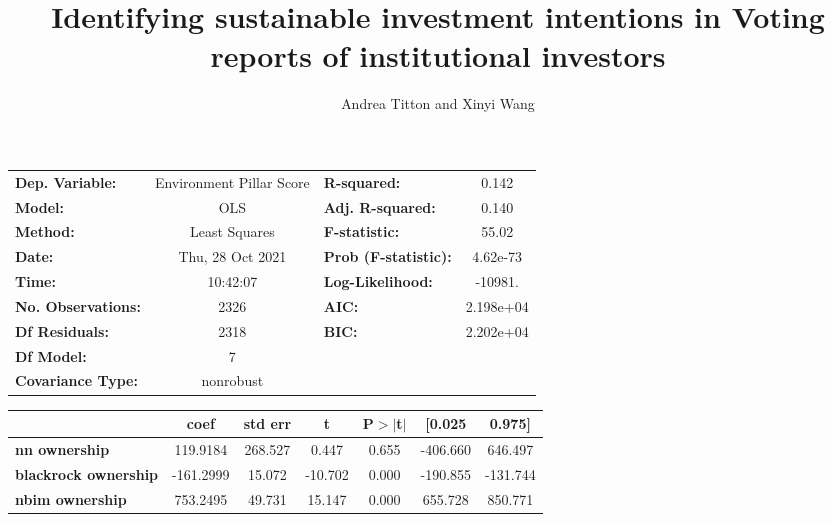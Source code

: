 \documentclass[a4paper]{article}
\title{Identifying sustainable investment intentions in Voting reports of institutional investors}
\author{Andrea Titton and Xinyi Wang}
\begin{document}
\maketitle
\begin{center}
  \begin{tabular}{lclc}
  \toprule
  \textbf{Dep. Variable:}                            & Environment Pillar Score & \textbf{  R-squared:         } &     0.142   \\
  \textbf{Model:}                                    &           OLS            & \textbf{  Adj. R-squared:    } &     0.140   \\
  \textbf{Method:}                                   &      Least Squares       & \textbf{  F-statistic:       } &     55.02   \\
  \textbf{Date:}                                     &     Thu, 28 Oct 2021     & \textbf{  Prob (F-statistic):} &  4.62e-73   \\
  \textbf{Time:}                                     &         10:42:07         & \textbf{  Log-Likelihood:    } &   -10981.   \\
  \textbf{No. Observations:}                         &            2326          & \textbf{  AIC:               } & 2.198e+04   \\
  \textbf{Df Residuals:}                             &            2318          & \textbf{  BIC:               } & 2.202e+04   \\
  \textbf{Df Model:}                                 &               7          & \textbf{                     } &             \\
  \textbf{Covariance Type:}                          &        nonrobust         & \textbf{                     } &             \\
  \bottomrule
  \end{tabular}
  \begin{tabular}{lcccccc}
                                                     & \textbf{coef} & \textbf{std err} & \textbf{t} & \textbf{P$> |$t$|$} & \textbf{[0.025} & \textbf{0.975]}  \\
  \midrule
  \textbf{nn ownership}                              &     119.9184  &      268.527     &     0.447  &         0.655        &     -406.660    &      646.497     \\
  \textbf{blackrock ownership}                       &    -161.2999  &       15.072     &   -10.702  &         0.000        &     -190.855    &     -131.744     \\
  \textbf{nbim ownership}                            &     753.2495  &       49.731     &    15.147  &         0.000        &      655.728    &      850.771     \\

\end{tabular}
\end{center}
\end{document}
